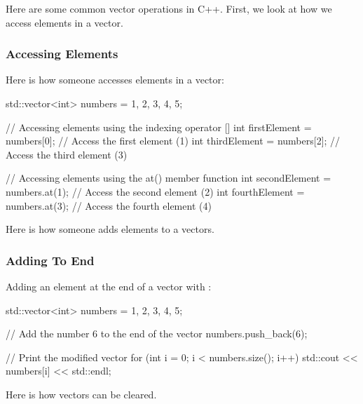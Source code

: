 Here are some common vector operations in C++. First, we look at how we access elements in a vector.

\begin{highlight}

\subsubsection*{Accessing Elements}

Here is how someone accesses elements in a vector:

\begin{code}
std::vector<int> numbers = {1, 2, 3, 4, 5};

// Accessing elements using the indexing operator []
int firstElement = numbers[0];  // Access the first element (1)
int thirdElement = numbers[2];  // Access the third element (3)

// Accessing elements using the at() member function
int secondElement = numbers.at(1);  // Access the second element (2)
int fourthElement = numbers.at(3);  // Access the fourth element (4)
\end{code}

\end{highlight}

Here is how someone adds elements to a vectors.

\begin{highlight}

\subsubsection*{Adding To End}

Adding an element at the end of a vector with :

\begin{code}
    std::vector<int> numbers = {1, 2, 3, 4, 5};
    
    // Add the number 6 to the end of the vector
    numbers.push_back(6);
    
    // Print the modified vector
    for (int i = 0; i < numbers.size(); i++) {
        std::cout << numbers[i] << std::endl;
    }
\end{code}

\end{highlight}

Here is how vectors can be cleared.

